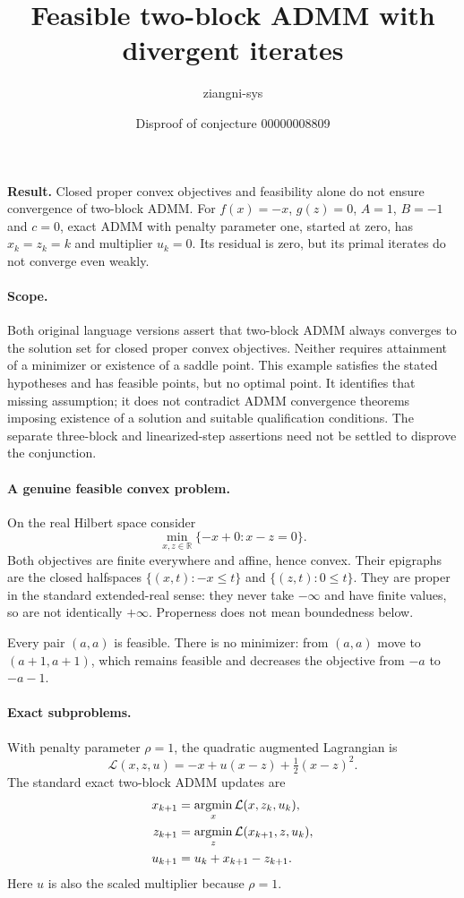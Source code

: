 \documentclass[11pt]{article}
\title{Feasible two-block ADMM with divergent iterates}
\author{ziangni-sys}
\date{Disproof of conjecture 00000008809}
\begin{document}
\raggedright
\maketitle
\noindent\textbf{Result.} Closed proper convex objectives and feasibility alone do not ensure convergence of two-block ADMM. For $f(x)=-x$, $g(z)=0$, $A=1$, $B=-1$ and $c=0$, exact ADMM with penalty parameter one, started at zero, has $x_k=z_k=k$ and multiplier $u_k=0$. Its residual is zero, but its primal iterates do not converge even weakly.

\paragraph{Scope.}
Both original language versions assert that two-block ADMM always converges to the solution set for closed proper convex objectives. Neither requires attainment of a minimizer or existence of a saddle point. This example satisfies the stated hypotheses and has feasible points, but no optimal point. It identifies that missing assumption; it does not contradict ADMM convergence theorems imposing existence of a solution and suitable qualification conditions. The separate three-block and linearized-step assertions need not be settled to disprove the conjunction.

\paragraph{A genuine feasible convex problem.}
On the real Hilbert space consider
\[
\min_{x,z\in\mathbb R}\{-x+0:x-z=0\}.
\]
Both objectives are finite everywhere and affine, hence convex. Their epigraphs are the closed halfspaces $\{(x,t):-x\le t\}$ and $\{(z,t):0\le t\}$. They are proper in the standard extended-real sense: they never take $-\infty$ and have finite values, so are not identically $+\infty$. Properness does not mean boundedness below.

Every pair $(a,a)$ is feasible. There is no minimizer: from $(a,a)$ move to $(a+1,a+1)$, which remains feasible and decreases the objective from $-a$ to $-a-1$.

\paragraph{Exact subproblems.}
With penalty parameter $\rho=1$, the quadratic augmented Lagrangian is
\[
\mathcal L(x,z,u)=-x+u(x-z)+\tfrac12(x-z)^2.
\]
The standard exact two-block ADMM updates are
\begin{align*}
x_{k+1}&=\mathop{\rm argmin}_{x}\mathcal L(x,z_k,u_k),\\
z_{k+1}&=\mathop{\rm argmin}_{z}\mathcal L(x_{k+1},z,u_k),\\
u_{k+1}&=u_k+x_{k+1}-z_{k+1}.
\end{align*}
Here $u$ is also the scaled multiplier because $\rho=1$.
\end{document}
